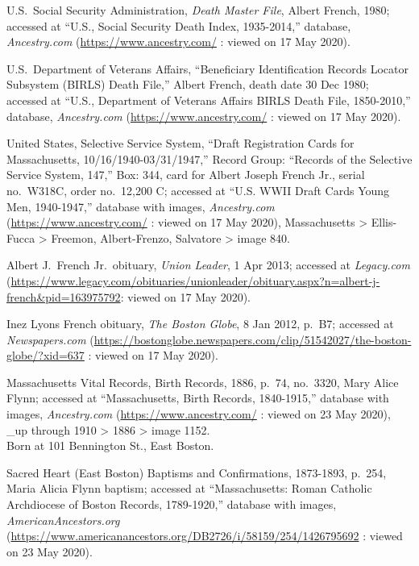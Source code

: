 \begin{thebibliography}{999}
	U.S.\ Social Security Administration, \textit{Death Master File}, Albert French, 1980; accessed at ``U.S., Social Security Death Index, 1935-2014,'' database, \textit{Ancestry.com} (\url{https://www.ancestry.com/} : viewed on 17 May 2020).
	
	U.S.\ Department of Veterans Affairs, ``Beneficiary Identification Records Locator Subsystem (BIRLS) Death File,'' Albert French, death date 30 Dec 1980; accessed at ``U.S., Department of Veterans Affairs BIRLS Death File, 1850-2010,'' database, \textit{Ancestry.com} (\url{https://www.ancestry.com/} : viewed on 17 May 2020).
	
	United States, Selective Service System, ``Draft Registration Cards for Massachusetts, 10/16/1940-03/31/1947,'' Record Group: ``Records of the Selective Service System, 147,'' Box: 344, card for Albert Joseph French Jr., serial no.\ W318C, order no.\ 12,200 C; accessed at ``U.S. WWII Draft Cards Young Men, 1940-1947,'' database with images, \textit{Ancestry.com} (\url{https://www.ancestry.com/} : viewed on 17 May 2020), Massachusetts > Ellis-Fucca > Freemon, Albert-Frenzo, Salvatore > image 840.
	
	Albert J.\ French Jr.\ obituary, \textit{Union Leader}, 1 Apr 2013; accessed at \textit{Legacy.com} (\url{https://www.legacy.com/obituaries/unionleader/obituary.aspx?n=albert-j-french\&pid=163975792}: viewed on 17 May 2020).
	
	Inez Lyons French obituary, \textit{The Boston Globe}, 8 Jan 2012, p.\ B7; accessed at \textit{Newspapers.com} (\url{https://bostonglobe.newspapers.com/clip/51542027/the-boston-globe/?xid=637} : viewed on 17 May 2020).
	
	Massachusetts Vital Records, Birth Records, 1886, p.\ 74, no.\ 3320, Mary Alice Flynn; accessed at ``Massachusetts, Birth Records, 1840-1915,'' database with images, \textit{Ancestry.com} (\url{https://www.ancestry.com/} : viewed on 23 May 2020), \_up through 1910 > 1886 > image 1152.\\
	Born at 101 Bennington St., East Boston.
	
	Sacred Heart (East Boston) Baptisms and Confirmations, 1873-1893, p.\ 254, Maria Alicia Flynn baptism; accessed at ``Massachusetts: Roman Catholic Archdiocese of Boston Records, 1789-1920,'' database with images, \textit{AmericanAncestors.org} (\url{https://www.americanancestors.org/DB2726/i/58159/254/1426795692} : viewed on 23 May 2020).
	

\end{thebibliography}
